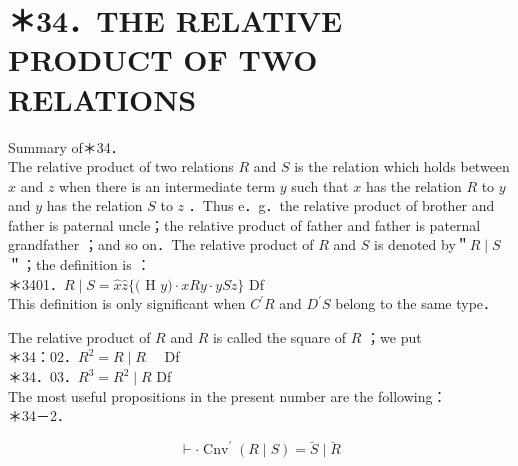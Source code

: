 \documentclass[10pt]{article}
\begin{document}
\section*{＊34．THE RELATIVE PRODUCT OF TWO RELATIONS}
Summary of＊34．\\
The relative product of two relations $R$ and $S$ is the relation which holds between $x$ and $z$ when there is an intermediate term $y$ such that $x$ has the relation $R$ to $y$ and $y$ has the relation $S$ to $z$ ．Thus e．g．the relative product of brother and father is paternal uncle；the relative product of father and father is paternal grandfather ；and so on．The relative product of $R$ and $S$ is denoted by＂$R \mid S$＂；the definition is ：\\
＊3401．$R \mid S=\hat{x} \hat{z}\{($ H $y) \cdot x R y \cdot y S \dot{z}\}$ Df\\
This definition is only significant when $C^{\prime} R$ and $D^{\prime} S$ belong to the same type．

The relative product of $R$ and $R$ is called the square of $R$ ；we put\\
＊34：02．$R^{2}=R \mid R \quad$ Df\\
＊34．03．$R^{3}=R^{2} \mid R$ Df\\
The most useful propositions in the present number are the following：\\
＊34－2．

$$
\vdash \cdot \operatorname{Cnv}^{\prime}(R \mid S)=\breve{S} \mid \breve{R}
$$
\end{document}
